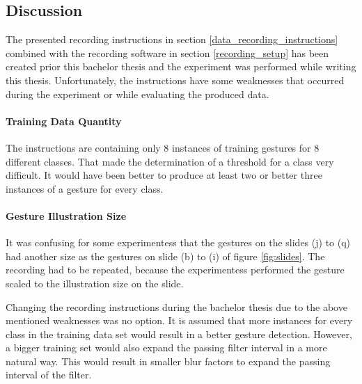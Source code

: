 \subsection{Discussion} \label{discussion} \label{instructions_review}
The presented recording instructions in section \ref{data_recording_instructions} combined with the recording software
in section \ref{recording_setup} has been created prior this bachelor thesis and the experiment was performed
while writing this thesis. Unfortunately, the instructions have some weaknesses that occurred during the experiment or
while evaluating the produced data.

\paragraph{Training Data Quantity} The instructions are containing only 8 instances of training gestures for 8 different
classes. That made the determination of a threshold for a class very difficult. It would have been better to produce at
least two or better three instances of a gesture for every class.

\paragraph{Gesture Illustration Size} It was confusing for some experimentess that the gestures on the slides (j) to (q)
had another size as the gestures on slide (b) to (i) of figure \ref{fig:slides}. The recording had to be repeated,
because the experimentess performed the gesture scaled to the illustration size on the slide.

Changing the recording instructions during the bachelor thesis due to the above mentioned weaknesses was no option. It
is assumed that more instances for every class in the training data set would result in a better gesture detection.
However, a bigger training set would also expand the passing filter interval in a more natural way. This would result
in smaller blur factors to expand the passing interval of the filter.
